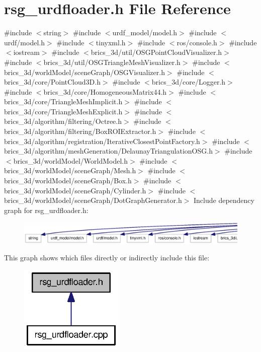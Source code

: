 \section{rsg\-\_\-urdfloader.\-h \-File \-Reference}
\label{rsg__urdfloader_8h}
{\ttfamily \#include $<$string$>$}\*
{\ttfamily \#include $<$urdf\-\_\-model/model.\-h$>$}\*
{\ttfamily \#include $<$urdf/model.\-h$>$}\*
{\ttfamily \#include $<$tinyxml.\-h$>$}\*
{\ttfamily \#include $<$ros/console.\-h$>$}\*
{\ttfamily \#include $<$iostream$>$}\*
{\ttfamily \#include $<$brics\-\_\-3d/util/\-O\-S\-G\-Point\-Cloud\-Visualizer.\-h$>$}\*
{\ttfamily \#include $<$brics\-\_\-3d/util/\-O\-S\-G\-Triangle\-Mesh\-Visualizer.\-h$>$}\*
{\ttfamily \#include $<$brics\-\_\-3d/world\-Model/scene\-Graph/\-O\-S\-G\-Visualizer.\-h$>$}\*
{\ttfamily \#include $<$brics\-\_\-3d/core/\-Point\-Cloud3\-D.\-h$>$}\*
{\ttfamily \#include $<$brics\-\_\-3d/core/\-Logger.\-h$>$}\*
{\ttfamily \#include $<$brics\-\_\-3d/core/\-Homogeneous\-Matrix44.\-h$>$}\*
{\ttfamily \#include $<$brics\-\_\-3d/core/\-Triangle\-Mesh\-Implicit.\-h$>$}\*
{\ttfamily \#include $<$brics\-\_\-3d/core/\-Triangle\-Mesh\-Explicit.\-h$>$}\*
{\ttfamily \#include $<$brics\-\_\-3d/algorithm/filtering/\-Octree.\-h$>$}\*
{\ttfamily \#include $<$brics\-\_\-3d/algorithm/filtering/\-Box\-R\-O\-I\-Extractor.\-h$>$}\*
{\ttfamily \#include $<$brics\-\_\-3d/algorithm/registration/\-Iterative\-Closest\-Point\-Factory.\-h$>$}\*
{\ttfamily \#include $<$brics\-\_\-3d/algorithm/mesh\-Generation/\-Delaunay\-Triangulation\-O\-S\-G.\-h$>$}\*
{\ttfamily \#include $<$brics\-\_\-3d/world\-Model/\-World\-Model.\-h$>$}\*
{\ttfamily \#include $<$brics\-\_\-3d/world\-Model/scene\-Graph/\-Mesh.\-h$>$}\*
{\ttfamily \#include $<$brics\-\_\-3d/world\-Model/scene\-Graph/\-Box.\-h$>$}\*
{\ttfamily \#include $<$brics\-\_\-3d/world\-Model/scene\-Graph/\-Cylinder.\-h$>$}\*
{\ttfamily \#include $<$brics\-\_\-3d/world\-Model/scene\-Graph/\-Dot\-Graph\-Generator.\-h$>$}\*
\-Include dependency graph for rsg\-\_\-urdfloader.\-h\-:
\nopagebreak
\begin{figure}[H]
\begin{center}
\leavevmode
\includegraphics[width=350pt]{rsg__urdfloader_8h__incl}
\end{center}
\end{figure}
\-This graph shows which files directly or indirectly include this file\-:
\nopagebreak
\begin{figure}[H]
\begin{center}
\leavevmode
\includegraphics[width=140pt]{rsg__urdfloader_8h__dep__incl}
\end{center}
\end{figure}
